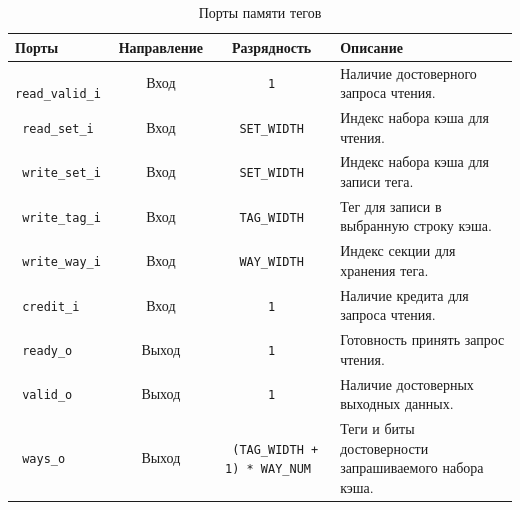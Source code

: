 \begin{table}[htbp]
	\centering
	\label{tab:tag_memory_ports}
	\small
	\begin{tabularx}{\textwidth}{l c c X}
		\toprule
		\textbf{Порты} & \textbf{Направление} & \textbf{Разрядность} & \textbf{Описание} \\
		\midrule
		\verb| read_valid_i | & Вход & \verb| 1 | & Наличие достоверного запроса чтения. \\
		\verb| read_set_i | & Вход & \verb| SET_WIDTH | & Индекс набора кэша для чтения. \\
		\verb| write_set_i | & Вход & \verb| SET_WIDTH | & Индекс набора кэша для записи тега. \\
		\verb| write_tag_i | & Вход & \verb| TAG_WIDTH | & Тег для записи в выбранную строку кэша. \\
		\verb| write_way_i | & Вход & \verb| WAY_WIDTH | & Индекс секции для хранения тега. \\
		\verb| credit_i | & Вход & \verb| 1 | & Наличие кредита для запроса чтения. \\
		\verb| ready_o | & Выход & \verb| 1 | & Готовность принять запрос чтения. \\
		\verb| valid_o | & Выход & \verb| 1 | & Наличие достоверных выходных данных. \\
		\verb| ways_o | & Выход & \verb| (TAG_WIDTH + 1) * WAY_NUM | & Теги и биты достоверности запрашиваемого набора кэша. \\
		\bottomrule
	\end{tabularx}
	\caption{Порты памяти тегов}
\end{table}
